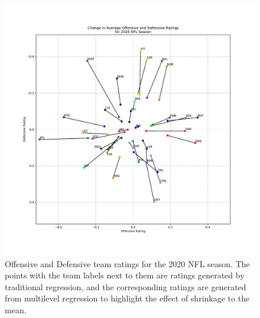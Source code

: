 \documentclass{uofsthesis-cs}
\begin{document}
\begin{appendices}
\begin{figure}
	\includegraphics[width=\textwidth]{figures/ratings_nfl.pdf}
	\caption{Offensive and Defensive team ratings for the 2020 NFL season. The points with the team labels next to them are ratings generated by traditional regression, and the corresponding ratings are generated from multilevel regression to highlight the effect of shrinkage to the mean.}
\end{figure}

\end{appendices}
\end{document}
